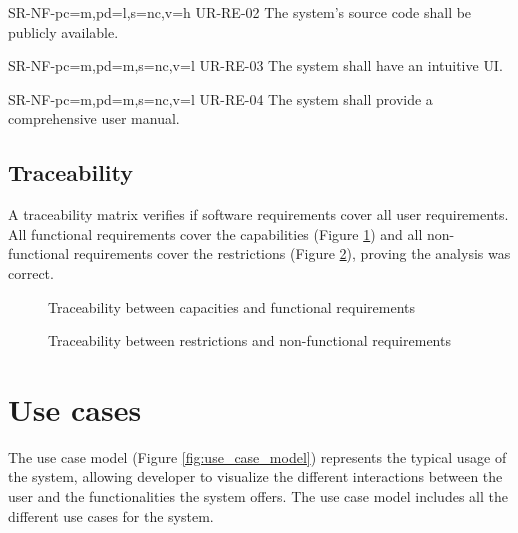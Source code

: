 \begin{softwareReq}{SR-NF-}{pc=m,pd=l,s=nc,v=h}
  {UR-RE-02}
  The system's source code shall be publicly available.
\end{softwareReq}

\begin{softwareReq}{SR-NF-}{pc=m,pd=m,s=nc,v=l}
  {UR-RE-03}
  The system shall have an intuitive \gls{UI}.
\end{softwareReq}

\begin{softwareReq}{SR-NF-}{pc=m,pd=m,s=nc,v=l}
  {UR-RE-04}
  The system shall provide a comprehensive user manual.
\end{softwareReq}

\FloatBarrier


\subsection{Traceability}\label{subsec:req-traceability}
A traceability matrix verifies if software requirements cover all user requirements. All functional requirements cover the capabilities (Figure \ref{fig:ca-fc-traceability}) and all non-functional requirements cover the restrictions (Figure \ref{fig:re-nf-traceability}), proving the analysis was correct.

\begin{figure}[h]
  \centering
  \caption{Traceability between capacities and functional requirements}
  \label{fig:ca-fc-traceability}
\end{figure}

\begin{figure}[h]
  \centering
  \caption{Traceability between restrictions and non-functional requirements}
  \label{fig:re-nf-traceability}
\end{figure}

\FloatBarrier


\section{Use cases}\label{sec:use-cases}
The use case model (Figure \ref{fig:use_case_model}) represents the typical usage of the system, allowing developer to visualize the different interactions between the user and the functionalities the system offers. The use case model includes all the different use cases for the system.

